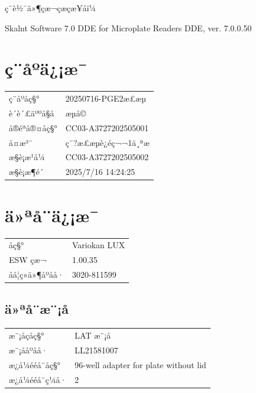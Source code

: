 \documentclass[UTF8,10pt,a4paper,fontset=fandol]{ctexart}
\newcommand{\fieldvalue}[1]{#1}
\begin{document}
ç¨è½¯ä»¶çæ¬çæçæ¥åï¼

\fieldvalue{Skalnt Software 7.0 DDE for Microplate Readers DDE, ver. 7.0.0.50}

\section{ç¨åºä¿¡æ¯}

\begin{tabular}{@{}ll@{}}
ç¨åºåç§° &
\fieldvalue{20250716-PGE2æ£æµ}\\
è´è´£äººå§å &
\fieldvalue{æµå©}\\
å®éªå®¤åç§° &
\fieldvalue{CC03-A3727202505001}\\
å¤æ³¨ &
\fieldvalue{ç¨?æ£æµè¿éç¬¬1ä¸ªæ}\\
æ§è¡æ¹å¼ &
\fieldvalue{CC03-A3727202505002}\\
æ§è¡æ¶é´ &
\fieldvalue{2025/7/16 14:24:25}
\end{tabular}

\section{ä»ªå¨ä¿¡æ¯}

\begin{tabular}{@{}ll@{}}
åç§° &
\fieldvalue{Variokan LUX}\\
ESW çæ¬ &
\fieldvalue{1.00.35}\\
åå­¦ç»ä»¶åºåå· &
\fieldvalue{3020-811599}
\end{tabular}

\subsection{ä»ªå¨æ¨¡å}

\begin{tabular}{@{}ll@{}}
æ¨¡åçåç§° &
\fieldvalue{LAT æ¨¡å}\\
æ¨¡ååºåå· &
\fieldvalue{LL21581007}\\
æ¿å¼ééå¨åç§° &
\fieldvalue{96-well adapter for plate without lid}\\
æ¿å¼ééå¨ç¼å· &
\fieldvalue{2}\\
\end{tabular}
\end{document}
